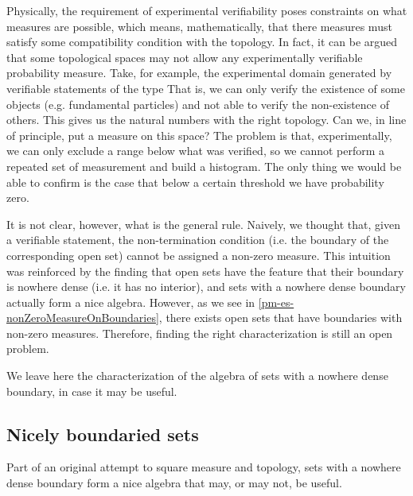 Physically, the requirement of experimental verifiability poses constraints on what measures are possible, which means, mathematically, that there measures must satisfy some compatibility condition with the topology. In fact, it can be argued that some topological spaces may not allow any experimentally verifiable probability measure. Take, for example, the experimental domain generated by verifiable statements of the type  That is, we can only verify the existence of some objects (e.g. fundamental particles) and not able to verify the non-existence of others. This gives us the natural numbers with the right topology. Can we, in line of principle, put a measure on this space? The problem is that, experimentally, we can only exclude a range below what was verified, so we cannot perform a repeated set of measurement and build a histogram. The only thing we would be able to confirm is the case that below a certain threshold we have probability zero.

It is not clear, however, what is the general rule. Naively, we thought that, given a verifiable statement, the non-termination condition (i.e. the boundary of the corresponding open set) cannot be assigned a non-zero measure. This intuition was reinforced by the finding that open sets have the feature that their boundary is nowhere dense (i.e. it has no interior), and sets with a nowhere dense boundary actually form a nice algebra. However, as we see in \ref{pm-es-nonZeroMeasureOnBoundaries}, there exists open sets that have boundaries with non-zero measures. Therefore, finding the right characterization is still an open problem.

We leave here the characterization of the algebra of sets with a nowhere dense boundary, in case it may be useful.


\subsection{Nicely boundaried sets}
Part of an original attempt to square measure and topology, sets with a nowhere dense boundary form a nice algebra that may, or may not, be useful.


